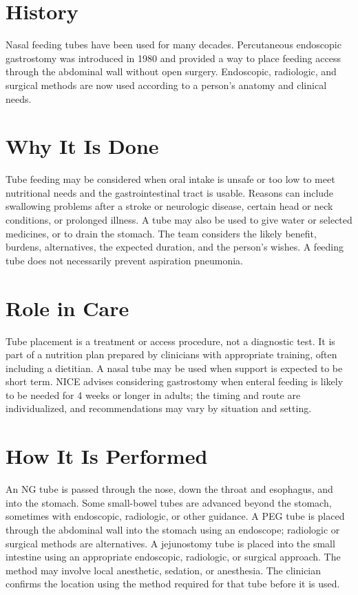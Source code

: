 \section*{History}
Nasal feeding tubes have been used for many decades. Percutaneous endoscopic gastrostomy was introduced in 1980 and provided a way to place feeding access through the abdominal wall without open surgery. Endoscopic, radiologic, and surgical methods are now used according to a person's anatomy and clinical needs.

\section*{Why It Is Done}
Tube feeding may be considered when oral intake is unsafe or too low to meet nutritional needs and the gastrointestinal tract is usable. Reasons can include swallowing problems after a stroke or neurologic disease, certain head or neck conditions, or prolonged illness. A tube may also be used to give water or selected medicines, or to drain the stomach. The team considers the likely benefit, burdens, alternatives, the expected duration, and the person's wishes. A feeding tube does not necessarily prevent aspiration pneumonia.

\section*{Role in Care}
Tube placement is a treatment or access procedure, not a diagnostic test. It is part of a nutrition plan prepared by clinicians with appropriate training, often including a dietitian. A nasal tube may be used when support is expected to be short term. NICE advises considering gastrostomy when enteral feeding is likely to be needed for 4 weeks or longer in adults; the timing and route are individualized, and recommendations may vary by situation and setting.

\section*{How It Is Performed}
An NG tube is passed through the nose, down the throat and esophagus, and into the stomach. Some small-bowel tubes are advanced beyond the stomach, sometimes with endoscopic, radiologic, or other guidance. A PEG tube is placed through the abdominal wall into the stomach using an endoscope; radiologic or surgical methods are alternatives. A jejunostomy tube is placed into the small intestine using an appropriate endoscopic, radiologic, or surgical approach. The method may involve local anesthetic, sedation, or anesthesia. The clinician confirms the location using the method required for that tube before it is used.


